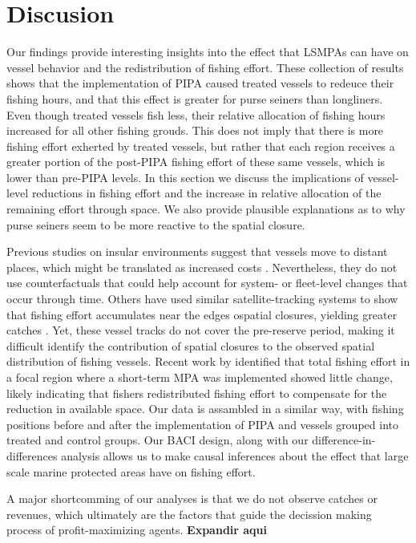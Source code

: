 \documentclass[12pt,]{article}
\begin{document}
\clearpage

\section{Discusion}\label{discusion}

Our findings provide interesting insights into the effect that LSMPAs
can have on vessel behavior and the redistribution of fishing effort.
These collection of results shows that the implementation of PIPA caused
treated vessels to redeuce their fishing hours, and that this effect is
greater for purse seiners than longliners. Even though treated vessels
fish less, their relative allocation of fishing hours increased for all
other fishing grouds. This does not imply that there is more fishing
effort exherted by treated vessels, but rather that each region receives
a greater portion of the post-PIPA fishing effort of these same vessels,
which is lower than pre-PIPA levels. In this section we discuss the
implications of vessel-level reductions in fishing effort and the
increase in relative allocation of the remaining effort through space.
We also provide plausible explanations as to why purse seiners seem to
be more reactive to the spatial closure.

Previous studies on insular environments suggest that vessels move to
distant places, which might be translated as increased costs
\citep{stevenson_2013}. Nevertheless, they do not use counterfactuals
that could help account for system- or fleet-level changes that occur
through time. Others have used similar satellite-tracking systems to
show that fishing effort accumulates near the edges ospatial closures,
yielding greater catches \citep{murawski_2005}. Yet, these vessel tracks
do not cover the pre-reserve period, making it difficult identify the
contribution of spatial closures to the observed spatial distribution of
fishing vessels. Recent work by \citet{elahi_2018} identified that total
fishing effort in a focal region where a short-term MPA was implemented
showed little change, likely indicating that fishers redistributed
fishing effort to compensate for the reduction in available space. Our
data is assambled in a similar way, with fishing positions before and
after the implementation of PIPA and vessels grouped into treated and
control groups. Our BACI design, along with our
difference-in-differences analysis allows us to make causal inferences
about the effect that large scale marine protected areas have on fishing
effort.

A major shortcomming of our analyses is that we do not observe catches
or revenues, which ultimately are the factors that guide the decission
making process of profit-maximizing agents. \textbf{Expandir aqui}
\end{document}
